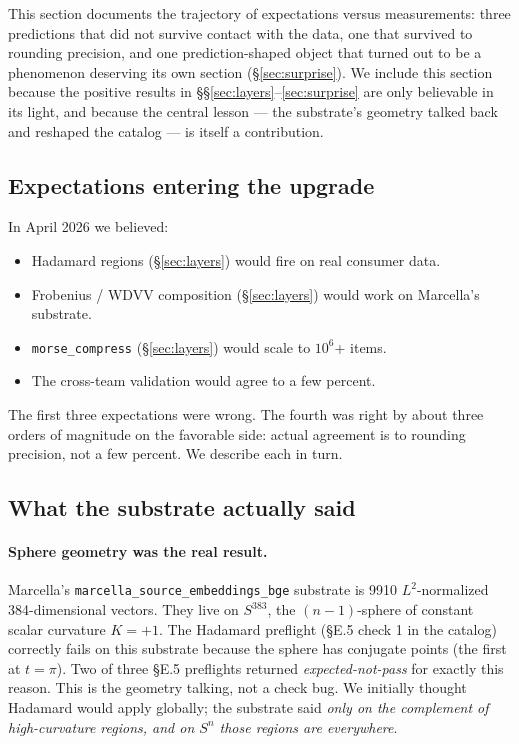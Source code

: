\documentclass[11pt,letterpaper]{article}
\begin{document}
This section documents the trajectory of expectations versus
measurements: three predictions that did not survive contact with
the data, one that survived to rounding precision, and one
prediction-shaped object that turned out to be a phenomenon
deserving its own section (\S\ref{sec:surprise}). We include this
section because the positive results in
\S\S\ref{sec:layers}--\ref{sec:surprise} are only believable in its
light, and because the central lesson --- the substrate's geometry
talked back and reshaped the catalog --- is itself a contribution.

\subsection{Expectations entering the upgrade}

In April 2026 we believed:

\begin{itemize}[nosep]
\item Hadamard regions (\S\ref{sec:layers}) would fire on real
  consumer data.
\item Frobenius / WDVV composition (\S\ref{sec:layers}) would work on
  Marcella's substrate.
\item \texttt{morse\_compress} (\S\ref{sec:layers}) would scale to
  $10^6$+ items.
\item The cross-team validation would agree to a few percent.
\end{itemize}

The first three expectations were wrong. The fourth was right by
about three orders of magnitude on the favorable side: actual
agreement is to rounding precision, not a few percent. We describe
each in turn.

\subsection{What the substrate actually said}

\paragraph{Sphere geometry was the real result.} Marcella's
\texttt{marcella\_source\_embeddings\_bge} substrate is 9910
$L^2$-normalized 384-dimensional vectors. They live on $S^{383}$, the
$(n-1)$-sphere of constant scalar curvature $K = +1$. The Hadamard
preflight (\S E.5 check 1 in the catalog) correctly fails on this
substrate because the sphere has conjugate points (the first at
$t = \pi$). Two of three \S E.5 preflights returned
\emph{expected-not-pass} for exactly this reason. This is the
geometry talking, not a check bug. We initially thought Hadamard
would apply globally; the substrate said \emph{only on the
complement of high-curvature regions, and on $S^n$ those regions are
everywhere}.
\end{document}
